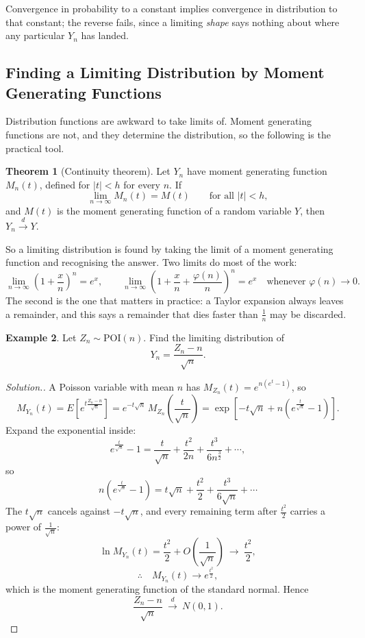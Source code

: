 \documentclass[12pt,a4paper]{report}
\theoremstyle{definition}
\newtheorem{thm}{Theorem}[section]
\newtheorem{example}[thm]{Example}
\theoremstyle{plain}
\newenvironment{solution}
  {\renewcommand{\qedsymbol}{}\begin{proof}[\textit{Solution}.]}
  {\end{proof}}
\begin{document}
Convergence in probability to a constant implies convergence in distribution to
that constant; the reverse fails, since a limiting \emph{shape} says nothing about
where any particular $Y_n$ has landed.

\subsection{Finding a Limiting Distribution by Moment Generating Functions}

Distribution functions are awkward to take limits of. Moment generating functions
are not, and they determine the distribution, so the following is the practical
tool.

\begin{thm}[Continuity theorem]
Let $Y_n$ have moment generating function $M_n(t)$, defined for $|t|<h$ for every
$n$. If
\[\lim_{n\to\infty}M_n(t)=M(t)\qquad\text{for all }|t|<h,\]
and $M(t)$ is the moment generating function of a random variable $Y$, then
$Y_n\overset{d}{\longrightarrow}Y$.
\end{thm}

So a limiting distribution is found by taking the limit of a moment generating
function and recognising the answer. Two limits do most of the work:
\[\lim_{n\to\infty}\left(1+\frac{x}{n}\right)^n=e^x,\qquad
\lim_{n\to\infty}\left(1+\frac{x}{n}+\frac{\varphi(n)}{n}\right)^n=e^x
\quad\text{whenever }\varphi(n)\to0.\]
The second is the one that matters in practice: a Taylor expansion always leaves a
remainder, and this says a remainder that dies faster than $\frac1n$ may be
discarded.

\begin{example}
Let $Z_n\sim\text{POI}(n)$. Find the limiting distribution of
\[Y_n=\frac{Z_n-n}{\sqrt n}.\]
\end{example}

\begin{solution}
A Poisson variable with mean $n$ has $M_{Z_n}(t)=e^{n\left(e^t-1\right)}$, so
\[M_{Y_n}(t)=E\left[e^{t\frac{Z_n-n}{\sqrt n}}\right]
=e^{-t\sqrt n}\,M_{Z_n}\!\left(\frac{t}{\sqrt n}\right)
=\exp\left[-t\sqrt n+n\left(e^{\frac{t}{\sqrt n}}-1\right)\right].\]
Expand the exponential inside:
\[e^{\frac{t}{\sqrt n}}-1=\frac{t}{\sqrt n}+\frac{t^2}{2n}
+\frac{t^3}{6n^{\frac32}}+\cdots,\]
so
\[n\left(e^{\frac{t}{\sqrt n}}-1\right)=t\sqrt n+\frac{t^2}{2}
+\frac{t^3}{6\sqrt n}+\cdots\]
The $t\sqrt n$ cancels against $-t\sqrt n$, and every remaining term after
$\frac{t^2}{2}$ carries a power of $\frac{1}{\sqrt n}$:
\[\ln M_{Y_n}(t)=\frac{t^2}{2}+O\!\left(\frac{1}{\sqrt n}\right)
\ \longrightarrow\ \frac{t^2}{2},\]
\[\therefore\quad M_{Y_n}(t)\longrightarrow e^{\frac{t^2}{2}},\]
which is the moment generating function of the standard normal. Hence
\[\frac{Z_n-n}{\sqrt n}\ \overset{d}{\longrightarrow}\ N(0,1).\]
\end{solution}
\end{document}
